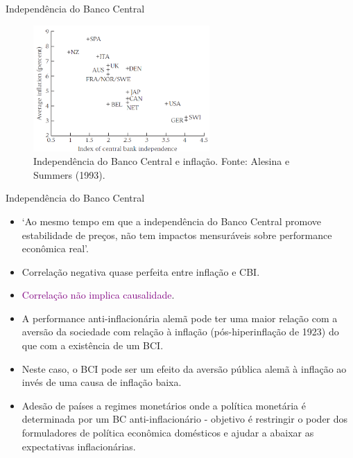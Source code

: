 \documentclass[10pt]{beamer}
\begin{document}
\begin{frame}{Independência do Banco Central}
    \begin{figure}
        \centering
        \includegraphics[width=0.6\textwidth]{./figures/aula12_fig5.PNG}
        \caption{Independência do Banco Central e inflação. Fonte: Alesina e Summers (1993).}
        \label{fig5}
    \end{figure}
\end{frame}

\begin{frame}{Independência do Banco Central}
    \begin{itemize}
        \item `Ao mesmo tempo em que a independência do Banco Central promove estabilidade de preços, não tem impactos mensuráveis sobre performance econômica real'.
        \bigskip
        \item Correlação negativa quase perfeita entre inflação e CBI.
        \bigskip
        \item \textcolor{purple}{Correlação não implica causalidade}.
        \bigskip
        \item A performance anti-inflacionária alemã pode ter uma maior relação com a aversão da sociedade com relação à inflação (pós-hiperinflação de 1923) do que com a existência de um BCI.
        \bigskip
        \item Neste caso, o BCI pode ser um efeito da aversão pública alemã à inflação ao invés de uma causa de inflação baixa.
        \bigskip
        \item Adesão de países a regimes monetários onde a política monetária é determinada por um BC anti-inflacionário - objetivo é restringir o poder dos formuladores de política econômica domésticos e ajudar a abaixar as expectativas inflacionárias.
    \end{itemize}
\end{frame}
\end{document}
